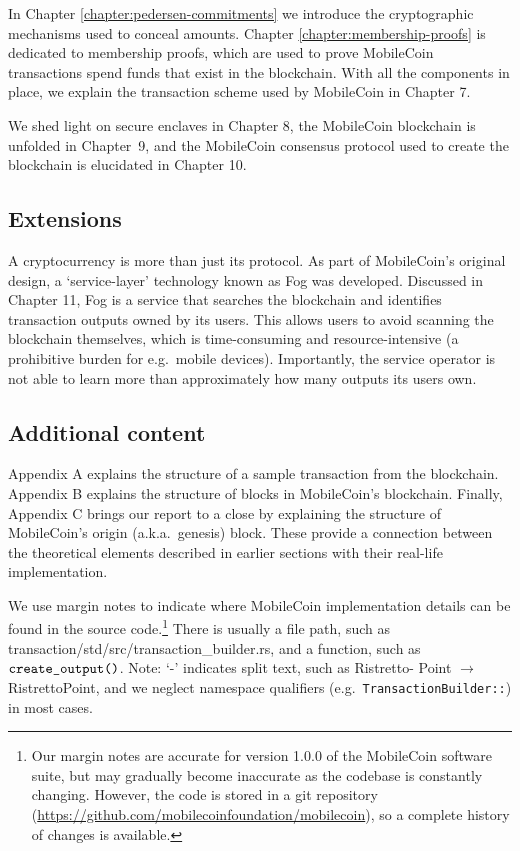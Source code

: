 In Chapter \ref{chapter:pedersen-commitments} we introduce the cryptographic mechanisms used to conceal amounts. Chapter \ref{chapter:membership-proofs} is dedicated to membership proofs, which are used to prove MobileCoin transactions spend funds that exist in the blockchain. With all the components in place, we explain the transaction scheme used by MobileCoin in Chapter 7.%

We shed light on secure enclaves in Chapter 8, the MobileCoin blockchain is unfolded in Chapter~9, and the MobileCoin consensus protocol used to create the blockchain is elucidated in Chapter 10.%


\subsection{Extensions}

A cryptocurrency is more than just its protocol. As part of MobileCoin's original design, a `service-layer' technology known as Fog was developed. Discussed in Chapter 11, Fog is a service that searches the blockchain and identifies transaction outputs owned by its users. This allows users to avoid scanning the blockchain themselves, which is time-consuming and resource-intensive (a prohibitive burden for e.g.\ mobile devices). Importantly, the service operator is not able to learn more than approximately how many outputs its users own.%


\subsection{Additional content}
Appendix A explains the structure of a sample transaction from the blockchain. Appendix B explains the structure of blocks in MobileCoin's blockchain. Finally, Appendix C brings our report to a close by explaining the structure of MobileCoin's origin (a.k.a.\ genesis) block. These provide a connection between the theoretical elements described in earlier sections with their real-life implementation.

We use margin notes to indicate where MobileCoin implementation details can be found in the source code.\footnote{Our margin notes are accurate for version 1.0.0 of the MobileCoin software suite, but may gradually become inaccurate as the codebase is constantly changing. However, the code is stored in a git repository (\url{https://github.com/mobilecoinfoundation/mobilecoin}), so a complete history of changes is available.} There is usually a file path, such as transaction/std/src/transaction\_builder.rs, and a function, such as \(\textrm{{\tt create\_output()}}\). Note: `-' indicates split text, such as Ristretto- Point $\rightarrow$ RistrettoPoint, and we neglect namespace qualifiers (e.g.\ {\tt TransactionBuilder::}) in most cases.

